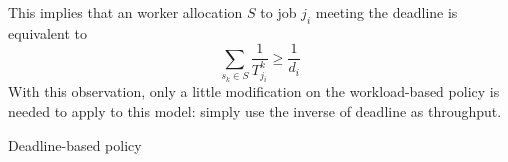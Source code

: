 This implies that an worker allocation $S$ to job $j_i$ meeting the
deadline is equivalent to
\[\displaystyle\sum_{s_k \in S}\frac{1}{T^k_{j_i}} \geq \frac{1}{d_i}\]
With this observation, only a little modification on the workload-based
policy is needed to apply to this model: simply use the inverse of
deadline as throughput.

\begin{algorithm}[H]
  
  \caption{Deadline-based policy}
  \label{algo:deadline-based}
\end{algorithm}
